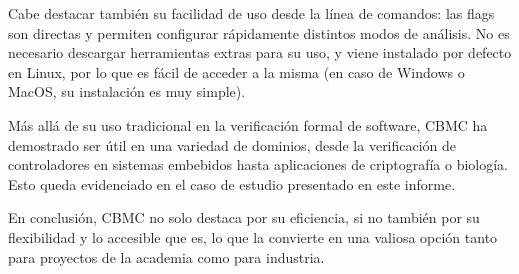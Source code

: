 \documentclass[runningheads]{llncs}
\begin{document}
Cabe destacar también su facilidad de uso desde la línea de comandos: las flags son directas y permiten configurar rápidamente distintos modos de análisis.
No es necesario descargar herramientas extras para su uso, y viene instalado por defecto en Linux, por lo que es fácil de acceder a la misma (en caso de Windows o MacOS, 
su instalación es muy simple).

Más allá de su uso tradicional en la verificación formal de software, CBMC ha demostrado ser útil en una variedad de dominios, desde la verificación de controladores en
sistemas embebidos hasta aplicaciones de criptografía o biología.
Esto queda evidenciado en el caso de estudio presentado en este informe.

En conclusión, CBMC no solo destaca por su eficiencia, si no también por su flexibilidad y lo accesible que es, lo que la convierte en una valiosa opción tanto para
proyectos de la academia como para industria.



\end{document}
